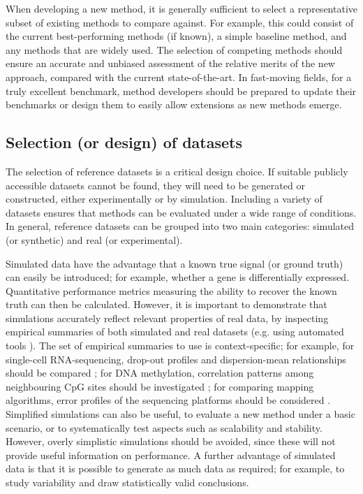 When developing a new method, it is generally sufficient to select a representative subset of existing methods to compare against. For example, this could consist of the current best-performing methods (if known), a simple baseline method, and any methods that are widely used. The selection of competing methods should ensure an accurate and unbiased assessment of the relative merits of the new approach, compared with the current state-of-the-art. In fast-moving fields, for a truly excellent benchmark, method developers should be prepared to update their benchmarks or design them to easily allow extensions as new methods emerge.

\subsection{Selection (or design) of datasets}

The selection of reference datasets is a critical design choice. If suitable publicly accessible datasets cannot be found, they will need to be generated or constructed, either experimentally or by simulation. Including a variety of datasets ensures that methods can be evaluated under a wide range of conditions. In general, reference datasets can be grouped into two main categories: simulated (or synthetic) and real (or experimental).

Simulated data have the advantage that a known true signal (or ground truth) can easily be introduced; for example, whether a gene is differentially expressed. Quantitative performance metrics measuring the ability to recover the known truth can then be calculated. However, it is important to demonstrate that simulations accurately reflect relevant properties of real data, by inspecting empirical summaries of both simulated and real datasets (e.g. using automated tools \cite{soneson_unifiedqualityverification_2018}). The set of empirical summaries to use is context-specific; for example, for single-cell RNA-sequencing, drop-out profiles and dispersion-mean relationships should be compared \cite{soneson_biasrobustnessscalability_2018}; for DNA methylation, correlation patterns among neighbouring CpG sites should be investigated \cite{korthauer_detectionaccuratefalse_2019}; for comparing mapping algorithms, error profiles of the sequencing platforms should be considered \cite{caboche_comparisonmappingalgorithms_2014}. Simplified simulations can also be useful, to evaluate a new method under a basic scenario, or to systematically test aspects such as scalability and stability. However, overly simplistic simulations should be avoided, since these will not provide useful information on performance. A further advantage of simulated data is that it is possible to generate as much data as required; for example, to study variability and draw statistically valid conclusions.

